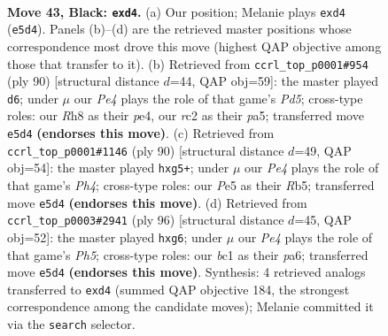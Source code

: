 \documentclass[11pt]{article}
\begin{document}
\clearpage

\begin{figure}[p]\centering
\begin{subfigure}{0.46\textwidth}\centering
\resizebox{\linewidth}{!}{%
\newchessgame
\chessboard[
  setfen={7r/r3k3/1pp3p1/4p1p1/Pp1PK3/4P3/2R5/2B5 b - - 0 43},
  showmover=false,
  pgfstyle=straightmove, color=movearrow, markmove={e5-d4}
]}
\caption{}
\end{subfigure}\hfill
\begin{subfigure}{0.46\textwidth}\centering
\resizebox{\linewidth}{!}{%
\newchessgame
\chessboard[
  setfen={8/1p4p1/2p2k2/p1PP1r1P/P1P1p3/6R1/6K1/8 w - - 1 46},
  showmover=false,
  pgfstyle=straightmove, color=movearrow, markmove={d5-d6}
]}
\caption{}
\end{subfigure}
\\[4pt]
\begin{subfigure}{0.46\textwidth}\centering
\resizebox{\linewidth}{!}{%
\newchessgame
\chessboard[
  setfen={8/5p2/5k1p/pR4p1/6PP/r3P3/5PK1/8 w - - 0 46},
  showmover=false,
  pgfstyle=straightmove, color=movearrow, markmove={h4-g5}
]}
\caption{}
\end{subfigure}\hfill
\begin{subfigure}{0.46\textwidth}\centering
\resizebox{\linewidth}{!}{%
\newchessgame
\chessboard[
  setfen={8/5p2/p4kpp/7P/2R1pPP1/r3P3/3K4/8 w - - 0 49},
  showmover=false,
  pgfstyle=straightmove, color=movearrow, markmove={h5-g6}
]}
\caption{}
\end{subfigure}
\caption{\textbf{Move 43, Black: \texttt{exd4}.} (a) Our position; Melanie plays \texttt{exd4} (\texttt{e5d4}). Panels (b)--(d) are the retrieved master positions whose correspondence most drove this move (highest QAP objective among those that transfer to it). (b) Retrieved from \texttt{ccrl\_top\_p0001\#954} (ply 90) [structural distance $d$=44, QAP obj=59]: the master played \texttt{d6}; under $\mu$ our \emph{Pe4} plays the role of that game's \emph{Pd5}; cross-type roles: our \emph{R}h8 as their \emph{p}e4, our \emph{r}c2 as their \emph{p}a5; transferred move \texttt{e5d4} \textbf{(endorses this move)}. (c) Retrieved from \texttt{ccrl\_top\_p0001\#1146} (ply 90) [structural distance $d$=49, QAP obj=54]: the master played \texttt{hxg5+}; under $\mu$ our \emph{Pe4} plays the role of that game's \emph{Ph4}; cross-type roles: our \emph{P}e5 as their \emph{R}b5; transferred move \texttt{e5d4} \textbf{(endorses this move)}. (d) Retrieved from \texttt{ccrl\_top\_p0003\#2941} (ply 96) [structural distance $d$=45, QAP obj=52]: the master played \texttt{hxg6}; under $\mu$ our \emph{Pe4} plays the role of that game's \emph{Ph5}; cross-type roles: our \emph{b}c1 as their \emph{p}a6; transferred move \texttt{e5d4} \textbf{(endorses this move)}. Synthesis: 4 retrieved analogs transferred to \texttt{exd4} (summed QAP objective 184, the strongest correspondence among the candidate moves); Melanie committed it via the \texttt{search} selector.}
\label{fig:thought-m85}
\end{figure}
\end{document}
